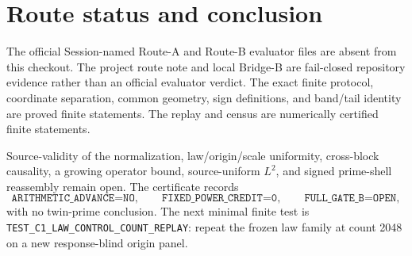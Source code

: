 \documentclass[10pt]{article}
\begin{document}
\section{Route status and conclusion}

The official Session-named Route-A and Route-B evaluator files are absent
from this checkout. The project route note and local Bridge-B are fail-closed
repository evidence rather than an official evaluator verdict. The exact
finite protocol, coordinate separation, common geometry, sign definitions,
and band/tail identity are proved finite statements. The replay and census
are numerically certified finite statements.

Source-validity of the normalization, law/origin/scale uniformity,
cross-block causality, a growing operator bound, source-uniform $L^2$, and
signed prime-shell reassembly remain open. The certificate records
\[
 \texttt{ARITHMETIC\_ADVANCE=NO},\qquad
 \texttt{FIXED\_POWER\_CREDIT=0},\qquad
 \texttt{FULL\_GATE\_B=OPEN},
\]
with no twin-prime conclusion. The next minimal finite test is
\texttt{TEST\_C1\_LAW\_CONTROL\_COUNT\_REPLAY}: repeat the frozen law family
at count 2048 on a new response-blind origin panel.
\end{document}
